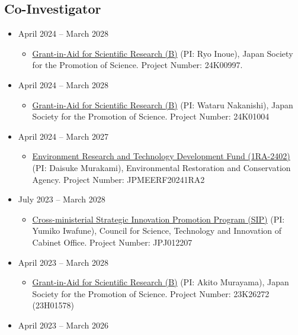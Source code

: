 \documentclass[
]{book}
\providecommand{\tightlist}{%
  \setlength{\itemsep}{0pt}\setlength{\parskip}{0pt}}
\begin{document}
\subsection*{Co-Investigator}\label{co-investigator}

\begin{itemize}
\tightlist
\item
  April 2024 -- March 2028

  \begin{itemize}
  \tightlist
  \item
    \href{https://kaken.nii.ac.jp/en/grant/KAKENHI-PROJECT-24K00997/}{Grant-in-Aid for Scientific Research (B)} (PI: Ryo Inoue),
    Japan Society for the Promotion of Science.
    Project Number: 24K00997.
  \end{itemize}
\item
  April 2024 -- March 2028

  \begin{itemize}
  \tightlist
  \item
    \href{https://kaken.nii.ac.jp/en/grant/KAKENHI-PROJECT-24K01004/}{Grant-in-Aid for Scientific Research (B)} (PI: Wataru Nakanishi),
    Japan Society for the Promotion of Science.
    Project Number: 24K01004
  \end{itemize}
\item
  April 2024 -- March 2027

  \begin{itemize}
  \tightlist
  \item
    \href{https://www.erca.go.jp/suishinhi/index.html}{Environment Research and Technology Development Fund (1RA-2402)} (PI: Daisuke Murakami),
    Environmental Restoration and Conservation Agency.
    Project Number: JPMEERF20241RA2
  \end{itemize}
\item
  July 2023 -- March 2028

  \begin{itemize}
  \tightlist
  \item
    \href{https://www.jst.go.jp/sip/sems/index.html}{Cross-ministerial Strategic Innovation Promotion Program (SIP)} (PI: Yumiko Iwafune),
    Council for Science, Technology and Innovation of Cabinet Office.
    Project Number: JPJ012207
  \end{itemize}
\item
  April 2023 -- March 2028

  \begin{itemize}
  \tightlist
  \item
    \href{https://kaken.nii.ac.jp/en/grant/KAKENHI-PROJECT-23K26272/}{Grant-in-Aid for Scientific Research (B)} (PI: Akito Murayama),
    Japan Society for the Promotion of Science.
    Project Number: 23K26272 (23H01578)
  \end{itemize}
\item
  April 2023 -- March 2026


\end{itemize}
\end{document}
